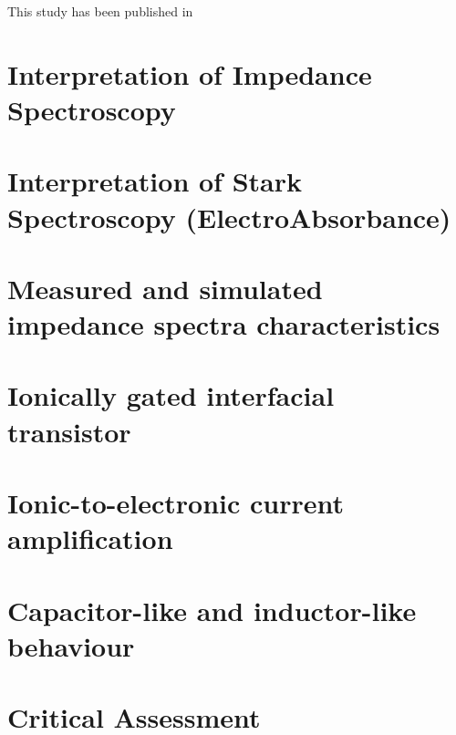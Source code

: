 

 This study has been published in %

\section{Interpretation of Impedance Spectroscopy}

\section{Interpretation of Stark Spectroscopy (ElectroAbsorbance)}




\section{Measured and simulated impedance spectra characteristics}
\section{Ionically gated interfacial transistor}
\section{Ionic-to-electronic current amplification}
\section{Capacitor-like and inductor-like behaviour}
\section{Critical Assessment}
